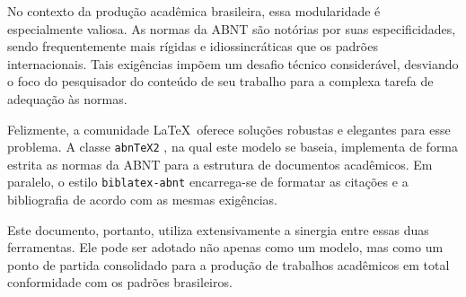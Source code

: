 No contexto da produção acadêmica brasileira, essa modularidade é especialmente valiosa. As normas da ABNT são notórias por suas especificidades, sendo frequentemente mais rígidas e idiossincráticas que os padrões internacionais. Tais exigências impõem um desafio técnico considerável, desviando o foco do pesquisador do conteúdo de seu trabalho para a complexa tarefa de adequação às normas.

Felizmente, a comunidade \LaTeX\ oferece soluções robustas e elegantes para esse problema. A classe \texttt{abn\TeX2} \cite{abntex2classe}, na qual este modelo se baseia, implementa de forma estrita as normas da ABNT para a estrutura de documentos acadêmicos. Em paralelo, o estilo \texttt{biblatex-abnt} \cite{biblatex-abnt} encarrega-se de formatar as citações e a bibliografia de acordo com as mesmas exigências.

Este documento, portanto, utiliza extensivamente a sinergia entre essas duas ferramentas. Ele pode ser adotado não apenas como um modelo, mas como um ponto de partida consolidado para a produção de trabalhos acadêmicos em total conformidade com os padrões brasileiros.
